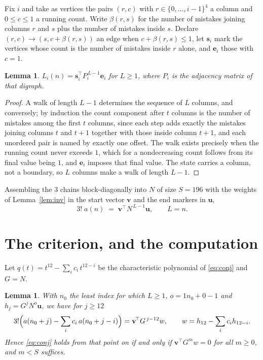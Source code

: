\documentclass[11pt,a4paper]{article}
\theoremstyle{plain}
\newtheorem{lemma}[theorem]{Lemma}
\theoremstyle{definition}
\begin{document}
Fix $i$ and take as vertices the pairs $(r,c)$ with $r\in\{0,\dots,i-1\}^{4}$ a column
and $0\le c\le1$ a running count. Write $\beta(r,s)$ for the number of mistakes joining
columns $r$ and $s$ plus the number of mistakes inside $s$. Declare $(r,c)\to(s,c+\beta(r,s))$
an edge when $c+\beta(r,s)\le1$, let $\mathbf{s}_i$ mark the vertices whose count is the
number of mistakes inside $r$ alone, and $\mathbf{e}_i$ those with $c=1$.

\begin{lemma}\label{lem:walk}
$L_i(n)=\mathbf{s}_i^{\!\top}P_i^{\,L-1}\mathbf{e}_i$ for $L\ge1$, where $P_i$ is the
adjacency matrix of that digraph.
\end{lemma}

\begin{proof}
A walk of length $L-1$ determines the sequence of $L$ columns, and conversely; by induction
the count component after $t$ columns is the number of mistakes among the first $t$ columns,
since each step adds exactly the mistakes joining columns $t$ and $t+1$ together with those
inside column $t+1$, and each unordered pair is named by exactly one offset. The walk exists
precisely when the running count never exceeds $1$, which for a nondecreasing count follows
from its final value being $1$, and $\mathbf{e}_i$ imposes that final value. The state
carries a column, not a boundary, so $L$ columns make a walk of length $L-1$.
\end{proof}

Assembling the $3$ chains block-diagonally into $N$ of size $S=196$ with the weights of
Lemma~\ref{lem:inv} in the start vector $\mathbf{v}$ and the end markers in
$\mathbf{u}$,
\begin{equation}\label{eq:walk2}
3!\;a(n)\;=\;\mathbf{v}^{\!\top}N^{\,L-1}\mathbf{u},\qquad L=n .
\end{equation}

\section{The criterion, and the computation}

Let $q(t)=t^{12}-\sum_i c_i\,t^{12-i}$ be the characteristic polynomial of
\eqref{eq:conj} and $G=N$.

\begin{lemma}\label{lem:crit}
With $n_0$ the least index for which $L\ge1$, $o=1n_0+0-1$ and
$h_j=G^{j}N^{o}\mathbf{u}$, we have for $j\ge12$
\[
3!\Bigl(a(n_0+j)-\sum_i c_i\,a(n_0+j-i)\Bigr)=\mathbf{v}^{\!\top}G^{\,j-12}w,
\qquad w=h_{12}-\sum_i c_ih_{12-i} .
\]
Hence \eqref{eq:conj} holds from that point on if and only if
$\mathbf{v}^{\!\top}G^{m}w=0$ for all $m\ge0$, and $m<S$ suffices.
\end{lemma}
\end{document}
